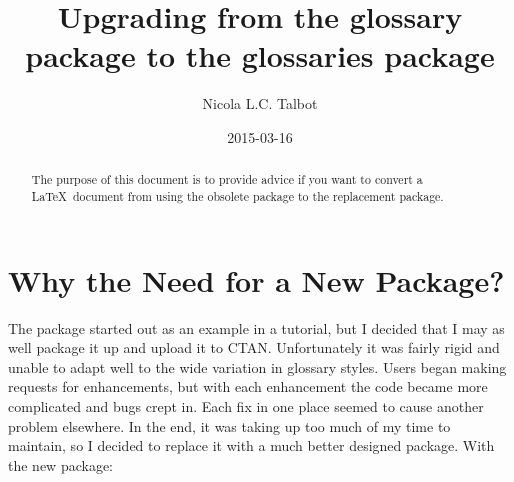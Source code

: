 \documentclass{nlctdoc}
\title{Upgrading from the glossary package to the glossaries
package}
\author{Nicola L.C. Talbot}
\date{2015-03-16}
\begin{document}
\maketitle

\begin{abstract}
The purpose of this document is to provide advice if you want to
convert a \LaTeX\ document from using the obsolete 
package to the replacement  package.
\end{abstract}

\tableofcontents

\section{Why the Need for a New Package?}
\label{whyglossaries}

The  package started out as an example in a tutorial,
but I decided that I may as well package it up and upload it to CTAN.
Unfortunately it was fairly rigid and unable to adapt well to the
wide variation in glossary styles. Users began making requests for
enhancements, but with each enhancement the code became more
complicated and bugs crept in. Each fix in one place seemed to cause
another problem elsewhere. In the end, it was taking up too much
of my time to maintain, so I decided to replace it with a much
better designed package. With the new  package:
\end{document}
